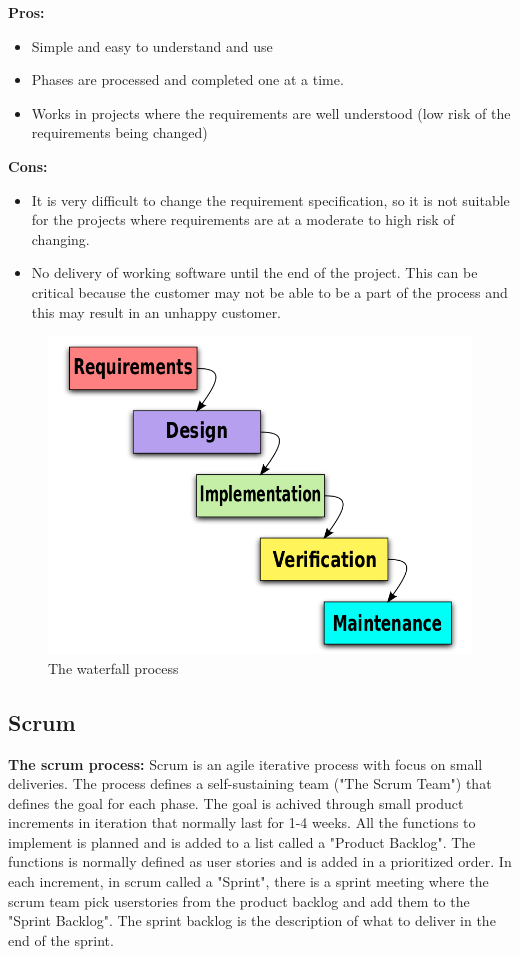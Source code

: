 {\bf Pros: }
\begin{itemize}
	\item Simple and easy to understand and use
	\item Phases are processed and completed one at a time.
	\item Works in projects where the requirements are well understood (low risk of the requirements being changed)
\end{itemize}
\clearpage
{\bf Cons: }
\begin{itemize}
	\item It is very difficult to change the requirement specification, so it is not suitable for the projects where requirements are at a moderate to high risk of changing.
	\item No delivery of working software until the end of the project. This can be critical because the customer may not
	be able to be a part of the process and this may result in an unhappy customer.
\end{itemize}

\begin{figure}[!ht]
\centering
\includegraphics[scale=0.3]{pictures/Waterfall_model.png}
\caption{The waterfall process}
\label{overflow}
\end{figure}


\subsection{Scrum}
{\bf The scrum process: }\cite{wikiScrum} Scrum is an agile iterative process with focus on small deliveries. The process
defines a self-sustaining team ("The Scrum Team") that defines the goal for each phase. The goal 
is achived through small product increments in iteration that normally last for 1-4 weeks. 
All the functions to implement is planned and is added to a list called a "Product Backlog". The
functions is normally defined as user stories and is added in a prioritized order. In each increment, 
in scrum called a "Sprint", there is a sprint meeting where the scrum team pick userstories from the 
product backlog and add them to the "Sprint Backlog". The sprint backlog is the description of what 
to deliver in the end of the sprint.

